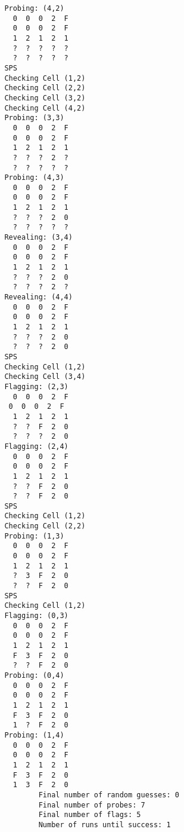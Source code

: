 \documentclass[british]{article}
\begin{document}
\begin{lstlisting}
               Probing: (4,2)
                 0  0  0  2  F
                 0  0  0  2  F
                 1  2  1  2  1
                 ?  ?  ?  ?  ?
                 ?  ?  ?  ?  ?
               SPS
               Checking Cell (1,2)
               Checking Cell (2,2)
               Checking Cell (3,2)
               Checking Cell (4,2)
               Probing: (3,3)
                 0  0  0  2  F
                 0  0  0  2  F
                 1  2  1  2  1
                 ?  ?  ?  2  ?
                 ?  ?  ?  ?  ?
               Probing: (4,3)
                 0  0  0  2  F
                 0  0  0  2  F
                 1  2  1  2  1
                 ?  ?  ?  2  0
                 ?  ?  ?  ?  ?
               Revealing: (3,4)
                 0  0  0  2  F
                 0  0  0  2  F
                 1  2  1  2  1
                 ?  ?  ?  2  0
                 ?  ?  ?  2  ?
               Revealing: (4,4)
                 0  0  0  2  F
                 0  0  0  2  F
                 1  2  1  2  1
                 ?  ?  ?  2  0
                 ?  ?  ?  2  0
               SPS
               Checking Cell (1,2)
               Checking Cell (3,4)
               Flagging: (2,3)
                 0  0  0  2  F
                0  0  0  2  F
                 1  2  1  2  1
                 ?  ?  F  2  0
                 ?  ?  ?  2  0
               Flagging: (2,4)
                 0  0  0  2  F
                 0  0  0  2  F
                 1  2  1  2  1
                 ?  ?  F  2  0
                 ?  ?  F  2  0
               SPS
               Checking Cell (1,2)
               Checking Cell (2,2)
               Probing: (1,3)
                 0  0  0  2  F
                 0  0  0  2  F
                 1  2  1  2  1
                 ?  3  F  2  0
                 ?  ?  F  2  0
               SPS
               Checking Cell (1,2)
               Flagging: (0,3)
                 0  0  0  2  F
                 0  0  0  2  F
                 1  2  1  2  1
                 F  3  F  2  0
                 ?  ?  F  2  0
               Probing: (0,4)
                 0  0  0  2  F
                 0  0  0  2  F
                 1  2  1  2  1
                 F  3  F  2  0
                 1  ?  F  2  0
               Probing: (1,4)
                 0  0  0  2  F
                 0  0  0  2  F
                 1  2  1  2  1
                 F  3  F  2  0
                 1  3  F  2  0
                       Final number of random guesses: 0
                       Final number of probes: 7
                       Final number of flags: 5
                       Number of runs until success: 1
\end{lstlisting}
\end{document}
